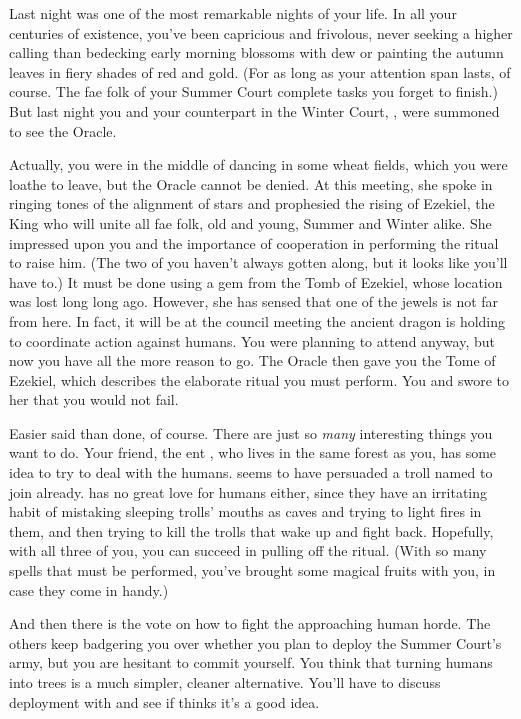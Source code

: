 \documentclass[char]{guildcamp2}
\begin{document}
\name{\cTreeFae{}}


Last night was one of the most remarkable nights of your life.  In all your centuries of existence, you've been capricious and frivolous, never seeking a higher calling than bedecking early morning blossoms with dew or painting the autumn leaves in fiery shades of red and gold.  (For as long as your attention span lasts, of course.  The fae folk of your Summer Court complete tasks you forget to finish.)  But last night you and your counterpart in the Winter Court, \cBabyFae{\intro}, were summoned to see the Oracle.

Actually, you were in the middle of dancing in some wheat fields, which you were loathe to leave, but the Oracle cannot be denied.  At this meeting, she spoke in ringing tones of the alignment of stars and prophesied the rising of Ezekiel, the King who will unite all fae folk, old and young, Summer and Winter alike.  She impressed upon you and \cBabyFae{} the importance of cooperation in performing the ritual to raise him.  (The two of you haven't always gotten along, but it looks like you'll have to.)  It must be done using a gem from the Tomb of Ezekiel, whose location was lost long long ago.  However, she has sensed that one of the jewels is not far from here.  In fact, it will be at the council meeting the ancient dragon \cOnyx{\intro} is holding to coordinate action against humans.  You were planning to attend anyway, but now you have all the more reason to go.  The Oracle then gave you the Tome of Ezekiel, which describes the elaborate ritual you must perform.  You and \cBabyFae{} swore to her that you would not fail.

Easier said than done, of course.  There are just so \emph{many} interesting things you want to do.  Your friend, the ent \cEnt{\intro}, who lives in the same forest as you, has some idea to try to deal with the humans.  \cEnt{} seems to have persuaded a troll named \cTroll{\intro} to join \cEnt{\them} already.  \cTroll{\They} has no great love for humans either, since they have an irritating habit of mistaking sleeping trolls' mouths as caves and trying to light fires in them, and then trying to kill the trolls that wake up and fight back.  Hopefully, with all three of you, you can succeed in pulling off the ritual.  (With so many spells that must be performed, you've brought some magical fruits with you, in case they come in handy.)

And then there is the vote on how to fight the approaching human horde.  The others keep badgering you over whether you plan to deploy the Summer Court's army, but you are hesitant to commit yourself.  You think that turning humans into trees is a much simpler, cleaner alternative.  You'll have to discuss deployment with \cBabyFae{} and see if \cBabyFae{\they} thinks it's a good idea.
\end{document}
